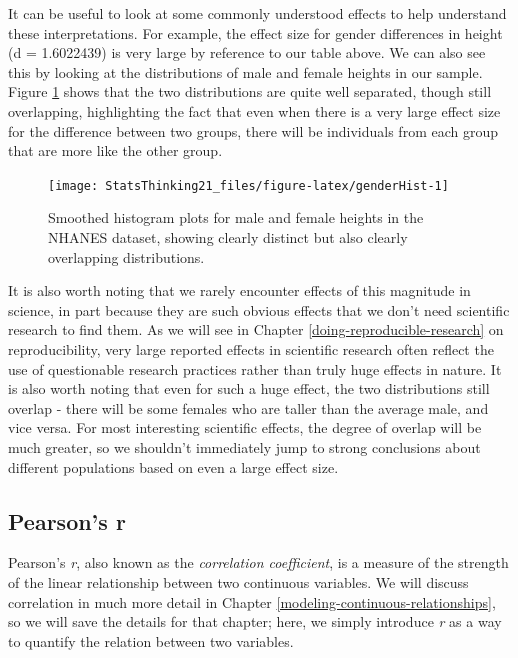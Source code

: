 \documentclass[12pt,]{book}
\begin{document}
It can be useful to look at some commonly understood effects to help understand these interpretations. For example, the effect size for gender differences in height (d = 1.6022439) is very large by reference to our table above. We can also see this by looking at the distributions of male and female heights in our sample. Figure \ref{fig:genderHist} shows that the two distributions are quite well separated, though still overlapping, highlighting the fact that even when there is a very large effect size for the difference between two groups, there will be individuals from each group that are more like the other group.

\begin{figure}
\texttt{[image: StatsThinking21\_files/figure-latex/genderHist-1]} \caption{Smoothed histogram plots for male and female heights in the NHANES dataset, showing clearly distinct but also clearly overlapping distributions.}\label{fig:genderHist}
\end{figure}

It is also worth noting that we rarely encounter effects of this magnitude in science, in part because they are such obvious effects that we don't need scientific research to find them. As we will see in Chapter \ref{doing-reproducible-research} on reproducibility, very large reported effects in scientific research often reflect the use of questionable research practices rather than truly huge effects in nature. It is also worth noting that even for such a huge effect, the two distributions still overlap - there will be some females who are taller than the average male, and vice versa. For most interesting scientific effects, the degree of overlap will be much greater, so we shouldn't immediately jump to strong conclusions about different populations based on even a large effect size.

\hypertarget{pearsons-r}{%
\subsection{Pearson's r}\label{pearsons-r}}

Pearson's \emph{r}, also known as the \emph{correlation coefficient}, is a measure of the strength of the linear relationship between two continuous variables. We will discuss correlation in much more detail in Chapter \ref{modeling-continuous-relationships}, so we will save the details for that chapter; here, we simply introduce \emph{r} as a way to quantify the relation between two variables.
\end{document}
